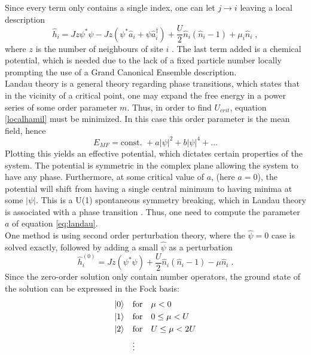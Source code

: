 Since every term only contains a single index, one can let $j \rightarrow i$ leaving a local description
\begin{equation}
	\hat{h}_i = J z \psi^* \psi - J z \left( \psi^* \hat{a}_i + \psi \hat{a}_{i}^{\dag} \right) + \frac{U}{2} \hat{n}_i \left( \hat{n}_i -1 \right) + \mu_i \hat{n}_i \; ,
	\label{localhamil}
\end{equation}
where $z$ is the number of neighbours of site $i$ \cite{vanoosten}. The last term added is a chemical potential, which is needed due to the lack of a fixed particle number locally prompting the use of a Grand Canonical Ensemble description.\\
Landau theory is a general theory regarding phase transitions, which states that in the vicinity of a critical point, one may expand the free energy in a power series of some order parameter $m$. Thus, in order to find $U_{crit}$, equation \eqref{localhamil} must be minimized. In this case this order parameter is the mean field, hence
\begin{equation}
	E_{MF} = \text{const. } + a |\psi|^2 + b |\psi|^4 + \ldots \label{eq:landau}
\end{equation} 
Plotting this yields an effective potential, which dictates certain properties of the system.
The potential is symmetric in the complex plane allowing the system to have any phase. Furthermore, at some critical value of $a$, (here $a = 0$), the potential will shift from having a single central minimum to having minima at some $|\psi|$. This is a U(1) spontaneous symmetry breaking, which in Landau theory is associated with a phase transition \cite{plischke}. Thus, one need to compute the parameter $a$ of equation \eqref{eq:landau}.\\
One method is using second order perturbation theory, where the $\hat{\psi} = 0$ case is solved exactly, followed by adding a small $\hat{\psi}$ as a perturbation
\begin{equation}
	\hat{h}_{i}^{(0)} = J z \left( \psi^* \psi \right) + \frac{U}{2} \hat{n}_i \left( \hat{n}_i -1 \right) - \mu \hat{n}_i \; .
\end{equation} 
Since the zero-order solution only contain number operators, the ground state of the solution can be expressed in the Fock basis:
\begin{align*}
	\ket{0} \quad &\text{for} \quad \mu < 0 \\
	\ket{1} \quad &\text{for} \quad 0 \leq \mu < U \\
	\ket{2} \quad &\text{for} \quad U \leq \mu < 2 U \\
	& \vdots
\end{align*} 
